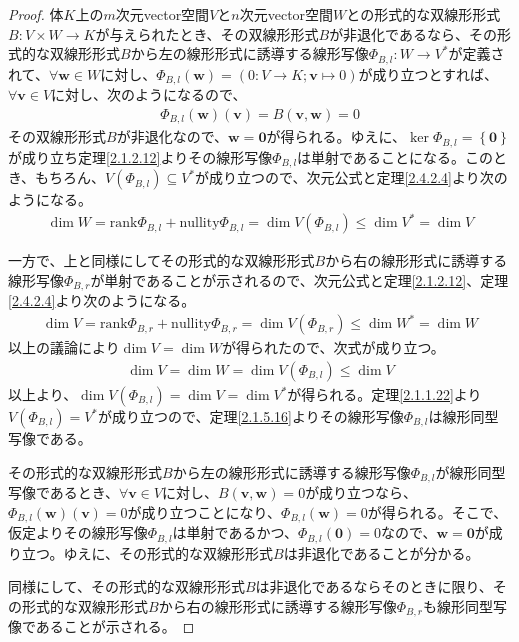 \documentclass[dvipdfmx]{jsarticle}
\begin{document}
\begin{proof}
体$K$上の$m$次元vector空間$V$と$n$次元vector空間$W$との形式的な双線形形式$B:V \times W \rightarrow K$が与えられたとき、その双線形形式$B$が非退化であるなら、その形式的な双線形形式$B$から左の線形形式に誘導する線形写像$\varPhi_{B,l}:W \rightarrow V^{*}$が定義されて、$\forall\mathbf{w} \in W$に対し、$\varPhi_{B,l}\left( \mathbf{w} \right) = \left( 0:V \rightarrow K;\mathbf{v} \mapsto 0 \right)$が成り立つとすれば、$\forall\mathbf{v} \in V$に対し、次のようになるので、
\begin{align*}
\varPhi_{B,l}\left( \mathbf{w} \right)\left( \mathbf{v} \right) = B\left( \mathbf{v},\mathbf{w} \right) = 0
\end{align*}
その双線形形式$B$が非退化なので、$\mathbf{w} = \mathbf{0}$が得られる。ゆえに、$\ker\varPhi_{B,l} = \left\{ \mathbf{0} \right\}$が成り立ち定理\ref{2.1.2.12}よりその線形写像$\varPhi_{B,l}$は単射であることになる。このとき、もちろん、$V\left( \varPhi_{B,l} \right) \subseteq V^{*}$が成り立つので、次元公式と定理\ref{2.4.2.4}より次のようになる。
\begin{align*}
\dim W = \mathrm{rank}\varPhi_{B,l} + \mathrm{nullity}\varPhi_{B,l} = \dim{V\left( \varPhi_{B,l} \right)} \leq \dim V^{*} = \dim V
\end{align*}\par
一方で、上と同様にしてその形式的な双線形形式$B$から右の線形形式に誘導する線形写像$\varPhi_{B,r}$が単射であることが示されるので、次元公式と定理\ref{2.1.2.12}、定理\ref{2.4.2.4}より次のようになる。
\begin{align*}
\dim V = \mathrm{rank}\varPhi_{B,r} + \mathrm{nullity}\varPhi_{B,r} = \dim{V\left( \varPhi_{B,r} \right)} \leq \dim W^{*} = \dim W
\end{align*}
以上の議論により$\dim V = \dim W$が得られたので、次式が成り立つ。
\begin{align*}
\dim V = \dim W = \dim{V\left( \varPhi_{B,l} \right)} \leq \dim V
\end{align*}
以上より、$\dim{V\left( \varPhi_{B,l} \right)} = \dim V = \dim V^{*}$が得られる。定理\ref{2.1.1.22}より$V\left( \varPhi_{B,l} \right) = V^{*}$が成り立つので、定理\ref{2.1.5.16}よりその線形写像$\varPhi_{B,l}$は線形同型写像である。\par
その形式的な双線形形式$B$から左の線形形式に誘導する線形写像$\varPhi_{B,l}$が線形同型写像であるとき、$\forall\mathbf{v} \in V$に対し、$B\left( \mathbf{v},\mathbf{w} \right) = 0$が成り立つなら、$\varPhi_{B,l}\left( \mathbf{w} \right)\left( \mathbf{v} \right) = 0$が成り立つことになり、$\varPhi_{B,l}\left( \mathbf{w} \right) = 0$が得られる。そこで、仮定よりその線形写像$\varPhi_{B,l}$は単射であるかつ、$\varPhi_{B,l}\left( \mathbf{0} \right) = 0$なので、$\mathbf{w} = \mathbf{0}$が成り立つ。ゆえに、その形式的な双線形形式$B$は非退化であることが分かる。\par
同様にして、その形式的な双線形形式$B$は非退化であるならそのときに限り、その形式的な双線形形式$B$から右の線形形式に誘導する線形写像$\varPhi_{B,r}$も線形同型写像であることが示される。
\end{proof}
\end{document}
